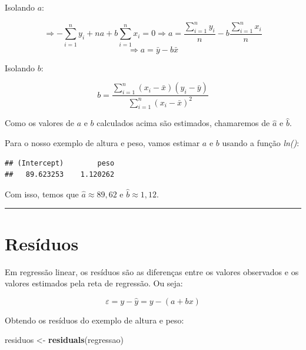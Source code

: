 \documentclass[
]{book}
\newenvironment{Shaded}{\begin{snugshade}}{\end{snugshade}}
\newcommand{\FunctionTok}[1]{\textcolor[rgb]{0.13,0.29,0.53}{\textbf{#1}}}
\newcommand{\NormalTok}[1]{#1}
\newcommand{\OtherTok}[1]{\textcolor[rgb]{0.56,0.35,0.01}{#1}}
\newcommand{\SpecialCharTok}[1]{\textcolor[rgb]{0.81,0.36,0.00}{\textbf{#1}}}
\begin{document}
Isolando \(a\):

\[
\Longrightarrow 
- \sum_{i=1}^{n} y_i + n a + b \sum_{i=1}^{n} x_i = 0
\Longrightarrow
a = \frac{\sum_{i=1}^{n} y_i}{n} - b \frac{\sum_{i=1}^{n} x_i}{n}
\]
\[
\Longrightarrow
a = \bar{y} - b\bar{x}
\]

Isolando \(b\):

\[
b = \frac{\sum_{i=1}^n (x_i - \bar{x})(y_i - \bar{y})}{\sum_{i=1}^n (x_i - \bar{x})^2}
\]

Como os valores de \(a\) e \(b\) calculados acima são estimados, chamaremos de \(\hat{a}\) e \(\hat{b}\).

Para o nosso exemplo de altura e peso, vamos estimar \(a\) e \(b\) usando a função \emph{ln()}:

\begin{Shaded}
\end{Shaded}

\begin{verbatim}
## (Intercept)        peso 
##   89.623253    1.120262
\end{verbatim}

Com isso, temos que \(\hat{a} \approx 89,62\) e \(\hat{b} \approx 1,12\).

\begin{center}\rule{0.5\linewidth}{0.5pt}\end{center}

\section{Resíduos}\label{resuxedduos}

Em regressão linear, os resíduos são as diferenças entre os valores observados e os valores estimados pela reta de regressão. Ou seja:

\[
\varepsilon = y - \hat{y} = y - (a + b x)
\]

Obtendo os resíduos do exemplo de altura e peso:

\begin{Shaded}
\begin{Highlighting}[]
\NormalTok{residuos }\OtherTok{\textless{}{-}} \FunctionTok{residuals}\NormalTok{(regressao)}
\end{Highlighting}
\end{Shaded}
\end{document}
